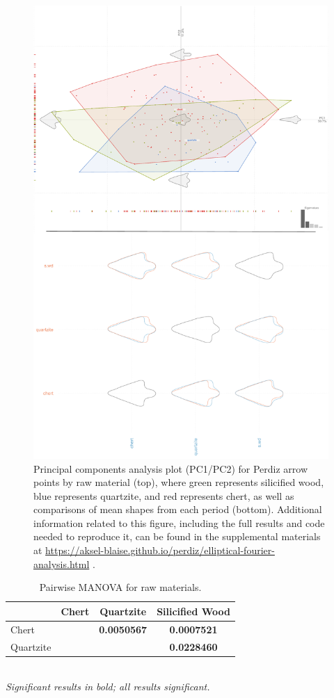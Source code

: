 \documentclass[review]{elsarticle}
\begin{document}
\begin{figure}[!]\centering
\includegraphics[width=0.85\linewidth]{rawmat.pdf}
\caption{Principal components analysis plot (PC1/PC2) for Perdiz arrow points by raw material (top), where green represents silicified wood, blue represents quartzite, and red represents chert, as well as comparisons of mean shapes from each period (bottom). Additional information related to this figure, including the full results and code needed to reproduce it, can be found in the supplemental materials at \href{https://aksel-blaise.github.io/perdiz/elliptical-fourier-analysis.html}{https://aksel-blaise.github.io/perdiz/elliptical-fourier-analysis.html} \citep{RN8980}.}
\label{fig:gmrawmat}
\end{figure}

\begin{table}[tbh]\centering
\footnotesize
\caption{Pairwise MANOVA for raw materials.}
\centering
\begin{tabular}{lccc}
\hline
 & Chert & Quartzite & Silicified Wood\\
\hline
Chert & & \textbf{0.0050567} & \textbf{0.0007521}\\
Quartzite & & & \textbf{0.0228460}\\
\hline
\end{tabular}\\
\textit{Significant results in bold; all results significant.}
\label{tab:tab.shape.raw}
\end{table}
\end{document}
